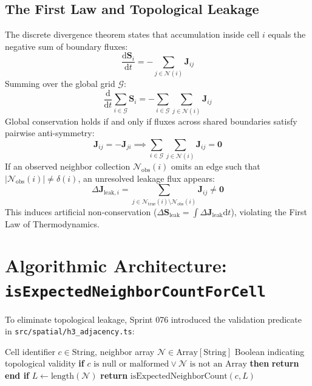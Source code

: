 \documentclass[10pt,journal,compsoc]{IEEEtran}
\begin{document}
\subsection{The First Law and Topological Leakage}
The discrete divergence theorem states that accumulation inside cell $i$ equals the negative sum of boundary fluxes:
\begin{equation}
\frac{\mathrm{d}\mathbf{S}_i}{\mathrm{d}t} = - \sum_{j \in \mathcal{N}(i)} \mathbf{J}_{ij}
\end{equation}
Summing over the global grid $\mathcal{G}$:
\begin{equation}
\frac{\mathrm{d}}{\mathrm{d}t} \sum_{i \in \mathcal{G}} \mathbf{S}_i = - \sum_{i \in \mathcal{G}} \sum_{j \in \mathcal{N}(i)} \mathbf{J}_{ij}
\end{equation}
Global conservation holds if and only if fluxes across shared boundaries satisfy pairwise anti-symmetry:
\begin{equation}
\mathbf{J}_{ij} = - \mathbf{J}_{ji} \implies \sum_{i \in \mathcal{G}} \sum_{j \in \mathcal{N}(i)} \mathbf{J}_{ij} = \mathbf{0}
\end{equation}
If an observed neighbor collection $\mathcal{N}_{\mathrm{obs}}(i)$ omits an edge such that $|\mathcal{N}_{\mathrm{obs}}(i)| \ne \delta(i)$, an unresolved leakage flux appears:
\begin{equation}
\Delta \mathbf{J}_{\mathrm{leak}, i} = \sum_{j \in \mathcal{N}_{\mathrm{true}}(i) \setminus \mathcal{N}_{\mathrm{obs}}(i)} \mathbf{J}_{ij} \ne \mathbf{0}
\end{equation}
This induces artificial non-conservation ($\Delta \mathbf{S}_{\mathrm{leak}} = \int \Delta \mathbf{J}_{\mathrm{leak}} \mathrm{d}t$), violating the First Law of Thermodynamics.

\section{Algorithmic Architecture: \texttt{isExpectedNeighborCountForCell}}

To eliminate topological leakage, Sprint 076 introduced the validation predicate in \texttt{src/spatial/h3\_adjacency.ts}:

\begin{algorithmic}[1]
\REQUIRE Cell identifier $c \in \text{String}$, neighbor array $\mathcal{N} \in \text{Array}[\text{String}]$
\ENSURE Boolean indicating topological validity
\STATE \textbf{if} $c \text{ is null or malformed} \lor \mathcal{N} \text{ is not an Array}$ \textbf{then}
\STATE \quad \textbf{return} \FALSE
\STATE \textbf{end if}
\STATE $L \leftarrow \text{length}(\mathcal{N})$
\STATE \textbf{return} $\text{isExpectedNeighborCount}(c, L)$
\end{algorithmic}
\end{document}
